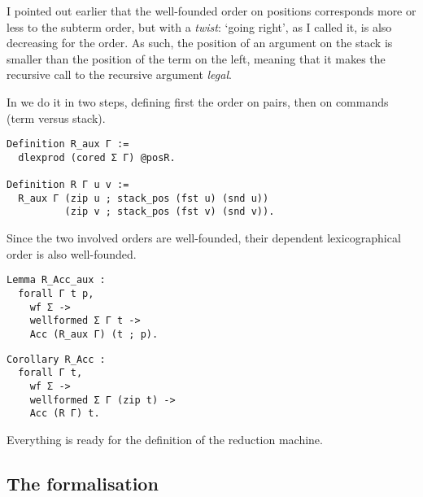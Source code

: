 I pointed out earlier that the well-founded order on positions corresponds more
or less to the subterm order, but with a \emph{twist}: `going right', as I
called it, is also decreasing for the order. As such, the position of an
argument on the stack is smaller than the position of the term on the left,
meaning that it makes the recursive call to the recursive argument \emph{legal}.

In \Coq we do it in two steps, defining first the order on pairs, then on
commands (term versus stack).
\begin{verbatim}
Definition R_aux Γ :=
  dlexprod (cored Σ Γ) @posR.

Definition R Γ u v :=
  R_aux Γ (zip u ; stack_pos (fst u) (snd u))
          (zip v ; stack_pos (fst v) (snd v)).
\end{verbatim}

Since the two involved orders are well-founded, their dependent lexicographical
order is also well-founded.

\begin{verbatim}
Lemma R_Acc_aux :
  forall Γ t p,
    wf Σ ->
    wellformed Σ Γ t ->
    Acc (R_aux Γ) (t ; p).
\end{verbatim}

\begin{verbatim}
Corollary R_Acc :
  forall Γ t,
    wf Σ ->
    wellformed Σ Γ (zip t) ->
    Acc (R Γ) t.
\end{verbatim}

Everything is ready for the definition of the reduction machine.

\subsection{The \Coq formalisation}

